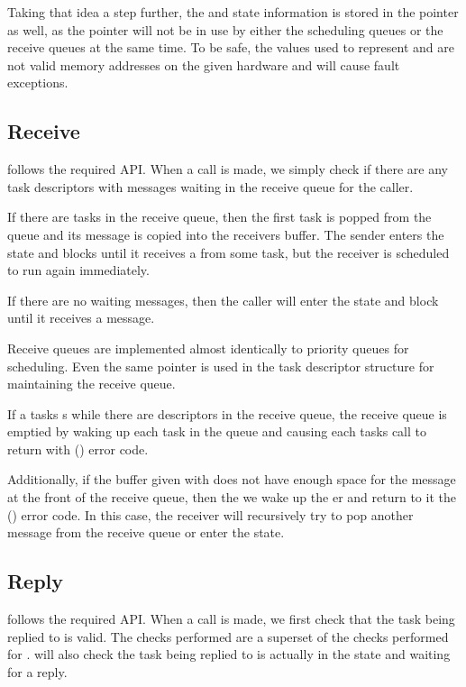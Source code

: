 \documentclass[pdftex,10pt,a4paper]{article}
\begin{document}
Taking that idea a step further, the  and
 state information is stored in the 
pointer as well, as the  pointer will not be in use by
either the scheduling queues or the receive queues at the same
time. To be safe, the values used to represent  and
 are not valid memory addresses on the given
hardware and will cause fault exceptions.


\subsection*{Receive}

 follows the required API. When a  call is
made, we simply check if there are any task descriptors with messages
waiting in the receive queue for the caller.

If there are tasks in the receive queue, then the first task is popped
from the queue and its message is copied into the receivers
buffer. The sender enters the  state and blocks
until it receives a  from some task, but the receiver is
scheduled to run again immediately.

If there are no waiting messages, then the caller will enter the
 state and block until it receives a message.

Receive queues are implemented almost identically to priority queues
for scheduling. Even the same  pointer is used in the task
descriptor structure for maintaining the receive queue.

If a tasks s while there are descriptors in the receive
queue, the receive queue is emptied by waking up each task in the
queue and causing each tasks  call to return with
 () error code.

Additionally, if the buffer given with  does not have
enough space for the message at the front of the receive queue, then
the we wake up the er and return to it the
 () error code. In this case, the
receiver will recursively try to pop another message from the receive
queue or enter the  state.

\subsection*{Reply}

 follows the required API. When a  call is
made, we first check that the task being replied to is valid. The
checks performed are a superset of the checks performed for
.  will also check the task being replied to is
actually in the  state and waiting for a reply.
\end{document}
